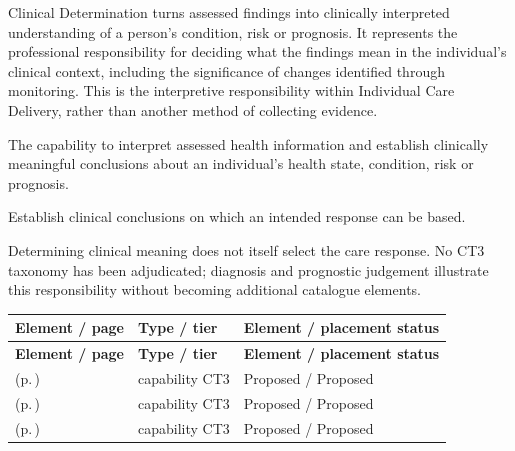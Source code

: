 Clinical Determination turns assessed findings into clinically interpreted understanding of a person's condition, risk or prognosis. It represents the professional responsibility for deciding what the findings mean in the individual's clinical context, including the significance of changes identified through monitoring. This is the interpretive responsibility within Individual Care Delivery, rather than another method of collecting evidence.



The capability to interpret assessed health information and establish clinically meaningful conclusions about an individual's health state, condition, risk or prognosis.



Establish clinical conclusions on which an intended response can be based.



Determining clinical meaning does not itself select the care response. No CT3 taxonomy has been adjudicated; diagnosis and prognostic judgement illustrate this responsibility without becoming additional catalogue elements.


\begingroup\small\setlength{\TableWidth}{\dimexpr\linewidth-6\tabcolsep-4\arrayrulewidth\relax}
\begin{longtable}{|>{\raggedright\arraybackslash}p{0.52\TableWidth}|>{\raggedright\arraybackslash}p{0.2\TableWidth}|>{\raggedright\arraybackslash}p{0.28\TableWidth}|}
\hline\rowcolor{TableHead}\textbf{Element / page} & \textbf{Type / tier} & \textbf{Element / placement status}\\\hline\endfirsthead
\hline\rowcolor{TableHead}\textbf{Element / page} & \textbf{Type / tier} & \textbf{Element / placement status}\\\hline\endhead
\hline\endfoot
\nameref{cap:bc-clinical-finding-interpretation} (p.\,\pageref{cap:bc-clinical-finding-interpretation}) & capability CT3 & Proposed / Proposed\\\hline
\nameref{cap:bc-diagnosis-problem-determination} (p.\,\pageref{cap:bc-diagnosis-problem-determination}) & capability CT3 & Proposed / Proposed\\\hline
\nameref{cap:bc-health-risk-prognostic-determination} (p.\,\pageref{cap:bc-health-risk-prognostic-determination}) & capability CT3 & Proposed / Proposed\\\hline
\end{longtable}\endgroup

